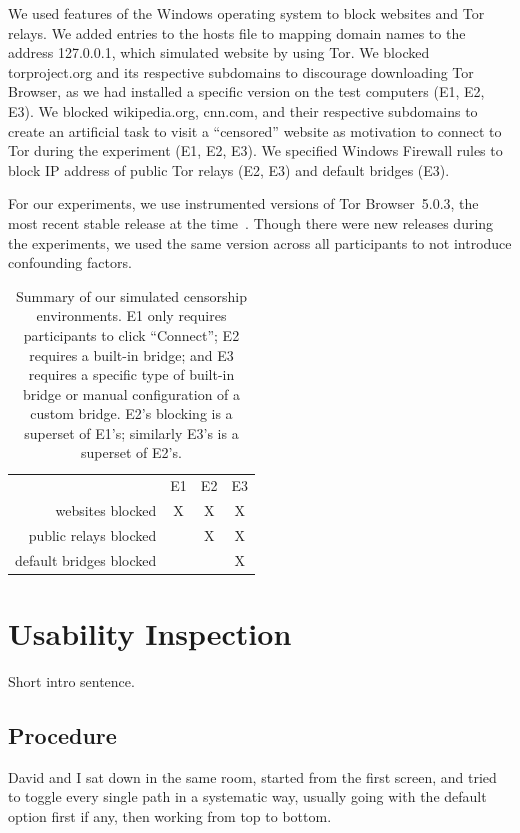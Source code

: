 \documentclass[USenglish,oneside,twocolumn]{article}
\begin{document}
We used features of the Windows operating system 
to block websites and Tor relays. 
We added entries to the hosts file to
mapping domain names to the address 127.0.0.1, which simulated
website by using Tor. We blocked torproject.org and its respective subdomains to discourage downloading Tor Browser, as we had installed a specific version on the test computers (E1, E2, E3).  We blocked wikipedia.org, cnn.com, and their respective subdomains to create an artificial task to visit a 
``censored'' website as motivation to connect to Tor during the experiment (E1, E2, E3). 
We specified Windows Firewall rules to block IP address of public Tor relays (E2, E3) and default bridges (E3).

For our experiments, we use instrumented versions of Tor Browser~5.0.3, 
the most recent stable release at the time~\cite{torbrowser-503}.
Though there were new releases during the experiments,
we used the same version across all participants to not introduce
confounding factors.

\begin{table}[t]
\centering
\begin{tabular}{r c c c}
& E1 & E2 & E3 \\
websites blocked & X & X & X \\
public relays blocked & & X & X \\
default bridges blocked & & & X \\
\end{tabular}
\caption{
Summary of our simulated censorship environments.
E1 only requires participants to click ``Connect'';
E2 requires a built-in bridge;
and E3 requires a specific type of built-in bridge
or manual configuration of a custom bridge.
E2's blocking is a superset of E1's;
similarly E3's is a superset of E2's.
}
\label{tab:environments}
\end{table}

\section{Usability Inspection}
{\color {blue}
Short intro sentence. 
}

\subsection{Procedure} 
{\color {blue}
David and I sat down in the same room, started from the first screen, and tried to toggle every single path in a systematic way, usually going with the default option first if any, then working from top to bottom.
}
\end{document}
